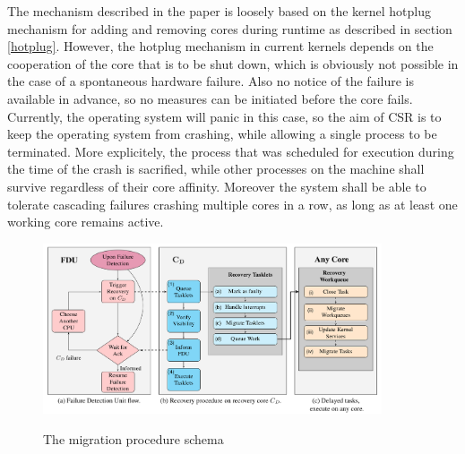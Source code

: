 \documentclass[a4paper,10pt,twoside]{article}
\begin{document}
The mechanism described in the paper is loosely based on the kernel hotplug mechanism for adding and removing cores during runtime as described in section \ref{hotplug}. However, the hotplug mechanism in current kernels depends on the cooperation of the core that is to be shut down, which is obviously not possible in the case of a spontaneous hardware failure. Also no notice of the failure is available in advance, so no measures can be initiated before the core fails. Currently, the operating system will panic in this case, so the aim of CSR is to keep the operating system from crashing, while allowing a single process to be terminated. More explicitely, the process that was scheduled for execution during the time of the crash is sacrified, while other processes on the machine shall survive regardless of their core affinity. Moreover the system shall be able to tolerate cascading failures crashing multiple cores in a row, as long as at least one working core remains active.

\begin{figure}[t]
	\caption{The migration procedure schema}
	\includegraphics[width=10cm]{recovery_procedure}
	\centering
	\label{fig:migration}
\end{figure}
\end{document}
